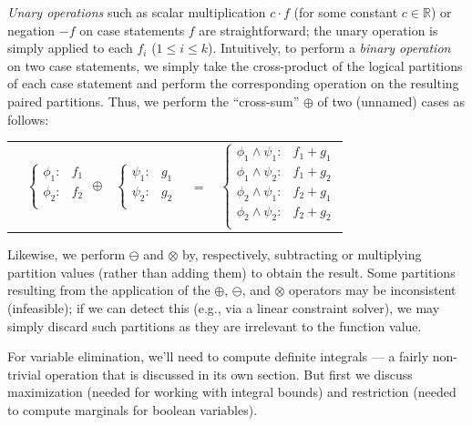 \documentclass[letterpaper]{article}
\renewcommand{\-}{\text{-}}
\begin{document}
{\emph{Unary operations} such as scalar multiplication $c\cdot f$ (for
some constant $c \in \mathbb{R}$) or negation $-f$ on case statements
$f$ are straightforward; the unary operation is simply applied to each
$f_i$ ($1 \leq i \leq k$). Intuitively, to perform a \emph{binary
  operation} on two case statements, we simply take the cross-product
of the logical partitions of each case statement and perform the
corresponding operation on the resulting paired partitions.  Thus, we 
perform the ``cross-sum'' $\oplus$ of two (unnamed) cases as follows:
\vspace{-1mm}
{\footnotesize 
\begin{center}
\begin{tabular}{r c c c l}
&
\hspace{-6mm} 
  $\begin{cases}
    \phi_1: & f_1 \\ 
    \phi_2: & f_2 \\ 
  \end{cases}$
$\oplus$
&
\hspace{-4mm}
  $\begin{cases}
    \psi_1: & g_1 \\ 
    \psi_2: & g_2 \\ 
  \end{cases}$
&
\hspace{-2mm} 
$ = $
&
\hspace{-2mm}
  $\begin{cases}
  \phi_1 \wedge \psi_1: & f_1 + g_1 \\ 
  \phi_1 \wedge \psi_2: & f_1 + g_2 \\ 
  \phi_2 \wedge \psi_1: & f_2 + g_1 \\ 
  \phi_2 \wedge \psi_2: & f_2 + g_2 \\ 
  \end{cases}$
\end{tabular}
\end{center}
}
\normalsize
Likewise, we perform $\ominus$ and $\otimes$ by,
respectively, subtracting or multiplying partition values (rather than
adding them) to obtain the result.  
Some partitions resulting from
the application of the $\oplus$, $\ominus$, and $\otimes$ operators
may be inconsistent (infeasible); if we can detect this (e.g., via
a linear constraint solver), we may simply discard such 
partitions as they are irrelevant to the function value.

For variable elimination, we'll need to compute definite integrals
 --- a fairly non-trivial operation
that is discussed in its own section.  But first we discuss 
maximization (needed for working with integral bounds) and restriction
(needed to compute marginals for boolean variables).

}
\end{document}
